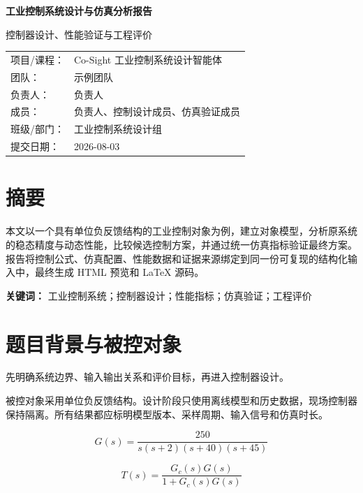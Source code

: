 \documentclass[UTF8,a4paper,12pt]{ctexart}
\begin{document}
\begin{titlepage}
  \thispagestyle{empty}
  \centering
  \vspace*{2.4cm}
  {\bfseries 工业控制系统设计与仿真分析报告\par}
  \vspace{1.2cm}
  { 控制器设计、性能验证与工程评价\par}
  \vfill
  \begin{tabular}{p{3.1cm}p{8.5cm}}
    项目/课程：& Co-Sight 工业控制系统设计智能体\\[0.65em]
    团队：& 示例团队\\[0.65em]
    负责人：& 负责人\\[0.65em]
    成员：& 负责人、控制设计成员、仿真验证成员\\[0.65em]
    班级/部门：& 工业控制系统设计组\\[0.65em]
    提交日期：& 2026-08-03\\[0.65em]
  \end{tabular}
  \vspace*{1cm}
\end{titlepage}
\clearpage
{}
\pagestyle{plain}
\tableofcontents
\clearpage
{}
\pagestyle{fancy}
\section*{摘要}
本文以一个具有单位负反馈结构的工业控制对象为例，建立对象模型，分析原系统的稳态精度与动态性能，比较候选控制方案，并通过统一仿真指标验证最终方案。报告将控制公式、仿真配置、性能数据和证据来源绑定到同一份可复现的结构化输入中，最终生成 HTML 预览和 LaTeX 源码。
\par
\noindent\textbf{关键词：} 工业控制系统；控制器设计；性能指标；仿真验证；工程评价
\clearpage
\section{题目背景与被控对象}\label{sec:model}
先明确系统边界、输入输出关系和评价目标，再进入控制器设计。
\par
被控对象采用单位负反馈结构。设计阶段只使用离线模型和历史数据，现场控制器保持隔离。所有结果都应标明模型版本、采样周期、输入信号和仿真时长。


\begin{equation}
G(s)=\frac{250}{s(s+2)(s+40)(s+45)}
\label{eq:plant}
\end{equation}

\begin{equation}
T(s)=\frac{G_c(s)G(s)}{1+G_c(s)G(s)}
\label{eq:closed_loop}
\end{equation}
\end{document}
